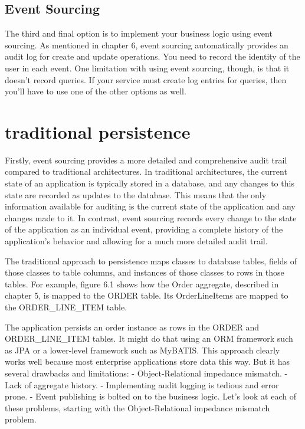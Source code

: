 \subsection{Event Sourcing}

The third and final option is to implement your business logic using event sourcing.
As mentioned in chapter 6, event sourcing automatically provides an audit log for create and update operations. You need to record the identity of the user in each event.
One limitation with using event sourcing, though, is that it doesn’t record queries. If
your service must create log entries for queries, then you’ll have to use one of the
other options as well.

\section{traditional persistence}

Firstly, event sourcing provides a more detailed and comprehensive audit trail compared to traditional architectures. In traditional architectures, the current state of an application is typically stored in a database, and any changes to this state are recorded as updates to the database. This means that the only information available for auditing is the current state of the application and any changes made to it. In contrast, event sourcing records every change to the state of the application as an individual event, providing a complete history of the application's behavior and allowing for a much more detailed audit trail.

The traditional approach to persistence maps classes to database tables, fields of those
classes to table columns, and instances of those classes to rows in those tables. For
example, figure 6.1 shows how the Order aggregate, described in chapter 5, is mapped to the ORDER table. Its OrderLineItems are mapped to the ORDER\_LINE\_ITEM table.

The application persists an order instance as rows in the ORDER and ORDER\_LINE\_ITEM
tables. It might do that using an ORM framework such as JPA or a lower-level framework such as MyBATIS.
 This approach clearly works well because most enterprise applications store data
this way. But it has several drawbacks and limitations:
- Object-Relational impedance mismatch.
- Lack of aggregate history.
- Implementing audit logging is tedious and error prone.
- Event publishing is bolted on to the business logic.
Let’s look at each of these problems, starting with the Object-Relational impedance
mismatch problem. \citep{richardson2018microservices}

